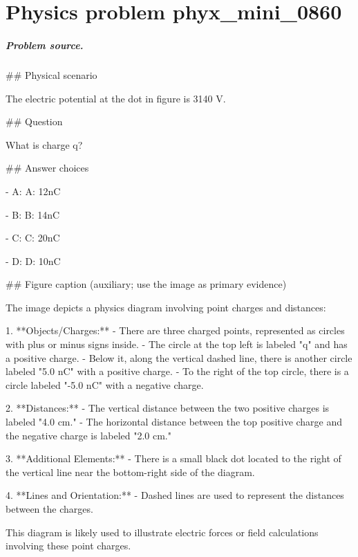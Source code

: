 
\chapter{Physics problem phyx\_mini\_0860}
\label{ch:PhyXMiniProblems_problem_phyx_mini_0860}

\paragraph{Problem source.}
\#\# Physical scenario

The electric potential at the dot in figure is 3140 V.

\#\# Question

What is charge q?

\#\# Answer choices

- A: A: 12nC

- B: B: 14nC

- C: C: 20nC

- D: D: 10nC

\#\# Figure caption (auxiliary; use the image as primary evidence)

The image depicts a physics diagram involving point charges and distances:

1. **Objects/Charges:**
   - There are three charged points, represented as circles with plus or minus signs inside.
   - The circle at the top left is labeled "q" and has a positive charge.
   - Below it, along the vertical dashed line, there is another circle labeled "5.0 nC" with a positive charge.
   - To the right of the top circle, there is a circle labeled "-5.0 nC" with a negative charge.

2. **Distances:**
   - The vertical distance between the two positive charges is labeled "4.0 cm."
   - The horizontal distance between the top positive charge and the negative charge is labeled "2.0 cm."

3. **Additional Elements:**
   - There is a small black dot located to the right of the vertical line near the bottom-right side of the diagram.

4. **Lines and Orientation:**
   - Dashed lines are used to represent the distances between the charges.

This diagram is likely used to illustrate electric forces or field calculations involving these point charges.

